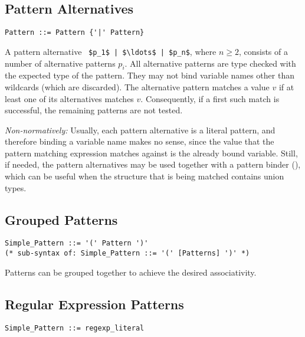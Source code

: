 \subsection{Pattern Alternatives}
\label{sec:pattern-alternatives}

\syntax\begin{lstlisting}
Pattern ::= Pattern {'|' Pattern}
\end{lstlisting}

A pattern alternative ~\lstinline!$p_1$ | $\ldots$ | $p_n$!, where $n \geq 2$, consists of a number of alternative patterns $p_i$. All alternative patterns are type checked with the expected type of the pattern. They may not bind variable names other than wildcards (which are discarded). The alternative pattern matches a value $v$ if at least one of its alternatives matches $v$. Consequently, if a first such match is successful, the remaining patterns are not tested.

{\em Non-normatively:} Usually, each pattern alternative is a literal pattern, and therefore binding a variable name makes no sense, since the value that the pattern matching expression matches against is the already bound variable. Still, if needed, the pattern alternatives may be used together with a pattern binder (), which can be useful when the structure that is being matched contains union types. 





\subsection{Grouped Patterns}
\label{sec:grouped-patterns}

\syntax\begin{lstlisting}
Simple_Pattern ::= '(' Pattern ')'
(* sub-syntax of: Simple_Pattern ::= '(' [Patterns] ')' *)
\end{lstlisting}

Patterns can be grouped together to achieve the desired associativity. 






\subsection{Regular Expression Patterns}
\label{sec:regexp-patterns}

\syntax\begin{lstlisting}
Simple_Pattern ::= regexp_literal
\end{lstlisting}

